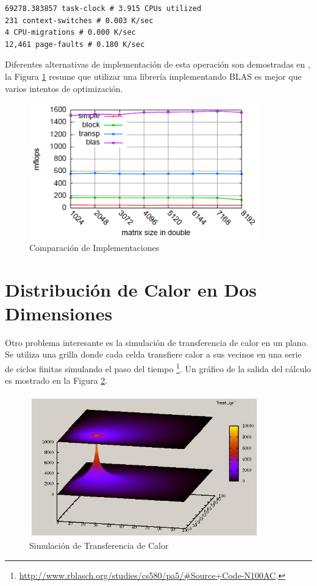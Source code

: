 \documentclass[a4paper]{report}
\begin{document}
\begin{verbatim}
69278.383857 task-clock # 3.915 CPUs utilized
231 context-switches # 0.003 K/sec
4 CPU-migrations # 0.000 K/sec
12,461 page-faults # 0.180 K/sec
\end{verbatim}

Diferentes alternativas de implementación de esta operación son demostradas en \cite{mm-tool}, la 
Figura \ref{fig:mm} resume que utilizar una librería implementando BLAS es mejor que varios intentos de optimización.

\begin{figure}[H]
\centering
\includegraphics[width=10cm]{mm.png}
\caption{Comparación de Implementaciones}
\label{fig:mm}
\end{figure}

\section{Distribución de Calor en Dos Dimensiones}

Otro problema interesante es la simulación de transferencia de calor en un plano.
Se utiliza una grilla donde cada celda transfiere calor a sus vecinos en una serie de ciclos finitas simulando el paso del tiempo \footnote{\href{http://www.rblasch.org/studies/cs580/pa5/\#Source+Code-N100AC}{http://www.rblasch.org/studies/cs580/pa5/\#Source+Code-N100AC}.}.
Un gráfico de la salida del cálculo es mostrado en la Figura \ref{fig:heat}.

\begin{figure}[H]
\centering
\includegraphics[width=10cm]{heat2d.png}
\caption{Simulación de Transferencia de Calor}
\label{fig:heat}
\end{figure}
\end{document}
